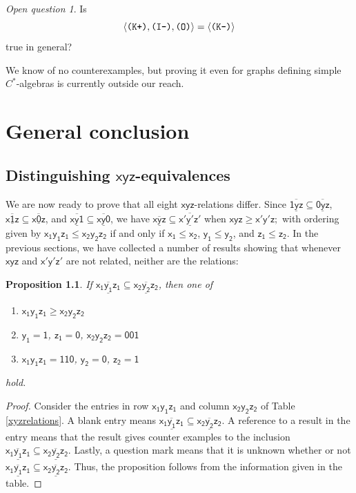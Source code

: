 \documentclass[12pt]{amsbook}%
\newtheorem{propo}[theor]{Proposition}
\theoremstyle{defin}
\theoremstyle{remark}
\newtheorem{openq}[theor]{Open question}
\numberwithin{equation}{chapter}
\numberwithin{theor}{section}
\newcommand{\xyz}[1]{\mbox{$\mathsf{#1}$}}
\newcommand{\xyzrel}[1]{\mbox{$\overline{\underline{\mathsf{ #1}}}$}}
\newcommand{\IIIm}{\mbox{\texttt{\textup{(I-)}}}}
\newcommand{\OOO}{\mbox{\texttt{\textup{(O)}}}}
\newcommand{\KKKp}{\mbox{\texttt{\textup{(K+)}}}}
\newcommand{\KKKm}{\mbox{\texttt{\textup{(K-)}}}}
\begin{document}
\begin{openq}\label{kplusq}
Is 
\[
\langle \KKKp,\IIIm,\OOO\rangle =\langle \KKKm\rangle
\]
true in general?
\end{openq}

We know of no counterexamples, but proving it even for graphs defining simple $C^*$-algebras is currently outside our reach.



\chapter{General conclusion}\label{gencon}
 
 
  \section{Distinguishing \xyz{xyz}-equivalences}

 

We are now ready to prove that all eight \xyz{xyz}-relations differ.  Since $\xyzrel{1yz} \subseteq \xyzrel{0yz}$, $\xyzrel{x1z} \subseteq \xyzrel{x0z}$, and $\xyzrel{xy1} \subseteq \xyzrel{xy0}$, we have $\xyzrel{xyz} \subseteq  \xyzrel{x'y'z'}$ when $\xyz{xyz}\geq \xyz{x'y'z;}$ with ordering given by $\xyz{x_1y_1z_1}\leq \xyz{x_2y_2z_2}$ if and only if $\xyz{x_1} \leq \xyz{x_2}$, $\xyz{y_1} \leq \xyz{y_2}$, and $\xyz{z_1} \leq \xyz{z_2}$.  In the previous sections, we have collected a number of results showing that whenever \xyz{xyz} and \xyz{x'y'z'} are not related, neither are the relations: 

\begin{propo}\label{notincl}
If $\xyzrel{x_1y_1z_1}\subseteq \xyzrel{x_2y_2z_2}$, then one of
\begin{enumerate}
\item $\xyz{x_1y_1z_1}\geq \xyz{x_2y_2z_2}$
\item $\xyz{y_1}=\xyz{1}$, $\xyz{z_1}=\xyz{0}$, $\xyz{x_2y_2z_2}=\xyz{001}$
\item $\xyz{x_1y_1z_1}=\xyz{110}$, $\xyz{y_2}=\xyz{0}$, $\xyz{z_2}=\xyz{1}$
\end{enumerate}
hold.
\end{propo}
\begin{proof}
Consider the entries in row $\xyz{x_1y_1z_1}$ and column $\xyz{x_2y_2z_2}$ of Table \ref{xyzrelations}.  A blank entry means $\xyzrel{x_1y_1z_1}\subseteq \xyzrel{x_2y_2z_2}$.  A reference to a result in the entry means that the result gives counter examples to the inclusion $\xyzrel{x_1y_1z_1}\subseteq \xyzrel{x_2y_2z_2}$.  Lastly, a question mark means that it is unknown whether or not $\xyzrel{x_1y_1z_1}\subseteq \xyzrel{x_2y_2z_2}$.   Thus, the proposition follows from the information given in the table.
\end{proof}
\end{document}
